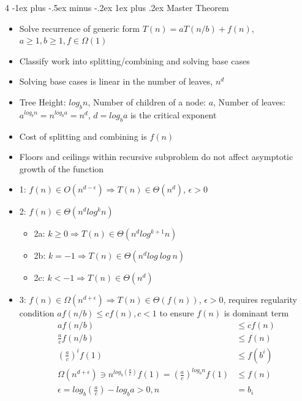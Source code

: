\documentclass[10pt, landscape]{article}
\makeatletter
\renewcommand{\subsection}{\@startsection{subsection}{3}{0mm}%
                                {-1ex plus -.5ex minus -.2ex}%
                                {1ex plus .2ex}%
                                {\normalfont\small\bfseries}}%
\makeatother
\begin{document}
\begin{multicols*}{4}
\subsection{Master Theorem}
\begin{itemize}
    \item Solve recurrence of generic form $T(n)=aT(n/b)+f(n)$, $a\geq 1, b \geq 1, f \in \Omega(1)$
    \item Classify work into splitting/combining and solving base cases
    \item Solving base cases is linear in the number of leaves, $n^d$
    \item Tree Height: $log_b n$, Number of children of a node: $a$, Number of leaves: $a^{log_bn}=n^{log_ba}=n^d$, $d=log_ba$ is the critical exponent
    \item Cost of splitting and combining is $f(n)$
    \item Floors and ceilings within recursive subproblem do not affect asymptotic growth of the function
\end{itemize}
\begin{itemize}
    \item 1: $f(n)\in O(n^{d-\epsilon}) \Rightarrow T(n)\in\Theta(n^{d})$, $\epsilon>0$
    \item 2: $f(n)\in\Theta(n^{d}log^kn)$
    \begin{itemize}
        \item 2a: $k \geq 0 \Rightarrow T(n)\in\Theta(n^{d}log^{k+1}n)$
        \item 2b: $k = -1 \Rightarrow T(n)\in\Theta(n^{d}log\ log\ n)$
        \item 2c: $k < -1 \Rightarrow T(n)\in\Theta(n^{d})$
    \end{itemize}
    \item 3: $f(n)\in\Omega(n^{d+\epsilon}) \Rightarrow T(n)\in\Theta(f(n))$, $\epsilon > 0$, requires regularity condition $af(n/b)\leq cf(n), c<1$ to ensure $f(n)$ is dominant term
    \begin{align*}
    af(n/b) &\leq cf(n) \\
    \frac{a}{c}f(n/b) &\leq f(n) \\
    (\frac{a}{c})^if(1) &\leq f(b^i) \\
    \Omega(n^{d+\epsilon}) \ni n^{log_b(\frac{a}{c})}f(1) = (\frac{a}{c})^{log_bn}f(1) &\leq f(n) \\
    \epsilon = log_b(\frac{a}{c})-log_ba > 0, n &= b_i
    \end{align*}
\end{itemize}


\end{multicols*}
\end{document}

